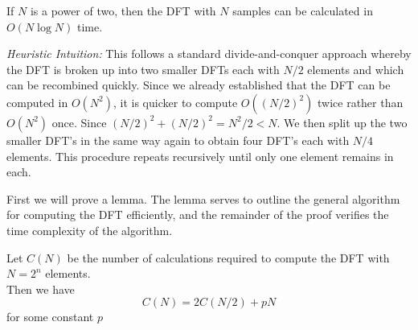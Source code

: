 \begin{theorem}
    If $N$ is a power of two, then the DFT with $N$ samples can be calculated in $O(N\log N)$ time.
\end{theorem}

\noindent\textit{Heuristic Intuition:}\lvm
This follows a standard divide-and-conquer approach whereby the DFT is broken up into two smaller DFTs each with $N/2$ elements and which can be recombined quickly. Since we already established that the DFT can be computed in $O(N^2)$, it is quicker to compute $O((N/2)^2)$ twice rather than $O(N^2)$ once. Since $(N/2)^2 + (N/2)^2 = N^2/2 < N$. We then split up the two smaller DFT's in the same way again to obtain four DFT's each with $N/4$ elements. This procedure repeats recursively until only one element remains in each.

First we will prove a lemma. The lemma serves to outline the general algorithm for computing the DFT efficiently, and the remainder of the proof verifies the time complexity of the algorithm.

\begin{lemma}
    Let $C(N)$ be the number of calculations required to compute the DFT with $N = 2^n$ elements.\\
    Then we have
    \begin{equation}
        C(N) = 2 C(N/2) + pN \label{eq:fftlem}
    \end{equation}
    for some constant $p$
\end{lemma}

